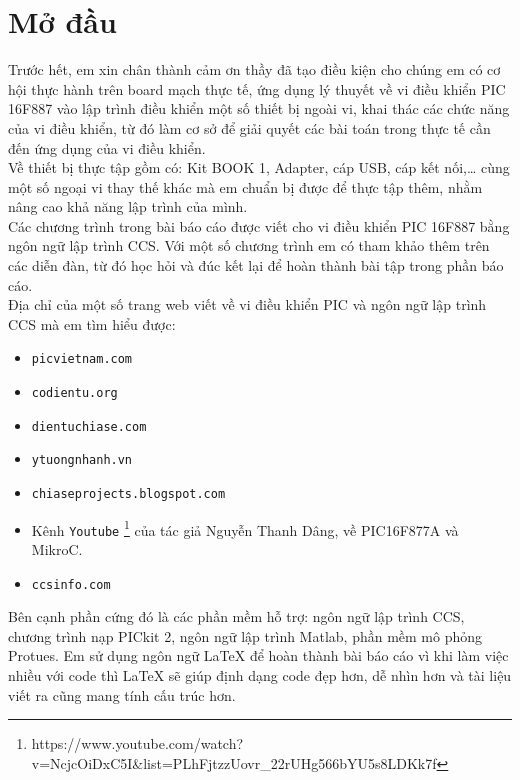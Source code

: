 \chapter*{Mở đầu}
\vspace{-1cm}Trước hết, em xin chân thành cảm ơn thầy đã tạo điều kiện cho chúng em có cơ hội thực hành trên board mạch thực tế, ứng dụng lý thuyết về vi điều khiển PIC 16F887 vào lập trình điều khiển một số thiết bị ngoài vi, khai thác các chức năng của vi điều khiển, từ đó làm cơ sở để giải quyết các bài toán trong thực tế cần đến ứng dụng của vi điều khiển.\\

Về thiết bị thực tập gồm có: Kit BOOK 1, Adapter, cáp USB, cáp kết nối,\ldots{} cùng một số ngoại vi thay thế khác mà em chuẩn bị được để thực tập thêm, nhằm nâng cao khả năng lập trình của mình.\\

Các chương trình trong bài báo cáo được viết cho vi điều khiển PIC 16F887 bằng ngôn ngữ lập trình CCS. Với một số chương trình em có tham khảo thêm trên các diễn đàn, từ đó học hỏi và đúc kết lại để hoàn thành bài tập trong phần báo cáo.\\

Địa chỉ của một số trang web viết về vi điều khiển PIC và ngôn ngữ lập trình CCS mà em tìm hiểu được:
\begin{itemize}
\item \verb|picvietnam.com|
\item \verb|codientu.org|
\item \verb|dientuchiase.com|
\item \verb|ytuongnhanh.vn|
\item \verb|chiaseprojects.blogspot.com|
\item Kênh \verb|Youtube| \footnote{https://www.youtube.com/watch?v=NcjcOiDxC5I\&list=PLhFjtzzUovr\_22rUHg566bYU5s8LDKk7f} của tác giả Nguyễn Thanh Dâng, về PIC16F877A và MikroC.
\item \verb|ccsinfo.com|
\end{itemize}

Bên cạnh phần cứng đó là các phần mềm hỗ trợ: ngôn ngữ lập trình CCS, chương trình nạp PICkit 2, ngôn ngữ lập trình Matlab, phần mềm mô phỏng Protues. Em sử dụng ngôn ngữ \LaTeX{} để hoàn thành bài báo cáo vì khi làm việc nhiều với code thì \LaTeX{} sẽ giúp định dạng code đẹp hơn, dễ nhìn hơn và tài liệu viết ra cũng mang tính cấu trúc hơn.\\ %

